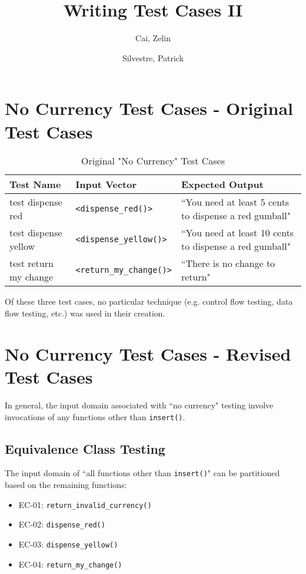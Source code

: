 \documentclass[10pt,letterpaper]{article}
\title{Writing Test Cases II}
\author{
	Cai, Zelin\\
	\and
	Silvestre, Patrick\\
}
\date{}
\begin{document}
\maketitle
\section{No Currency Test Cases - Original Test Cases}
\begin{table}[!htb]
\begin{tabularx}{\textwidth}{XXX}
\toprule
Test Name &
    Input Vector &
    Expected Output \\ \midrule
test dispense red &
    \texttt{<dispense\_red()>} &
    ``You need at least 5 cents to dispense a red gumball" \\ \midrule
test dispense yellow &
    \texttt{<dispense\_yellow()>} &
    ``You need at least 10 cents to dispense a red gumball" \\ \midrule
test return my change &
    \texttt{<return\_my\_change()>} &
    ``There is no change to return" \\ \bottomrule
\end{tabularx}
\caption{Original "No Currency" Test Cases}
\end{table}

Of these three test cases, no particular technique (e.g. control flow testing, data flow testing, etc.) was used in their creation.

\newpage
\section{No Currency Test Cases - Revised Test Cases}
In general, the input domain associated with ``no currency" testing involve invocations of any functions other than \texttt{insert()}.

\subsection{Equivalence Class Testing}
The input domain of ``all functions other than \texttt{insert()}" can be partitioned based on the remaining functions: 
\begin{itemize}
    \item{EC-01: \texttt{return\_invalid\_currency()}}
    \item{EC-02: \texttt{dispense\_red()}}
    \item{EC-03: \texttt{dispense\_yellow()}}
    \item{EC-04: \texttt{return\_my\_change()}}
\end{itemize}
\end{document}
